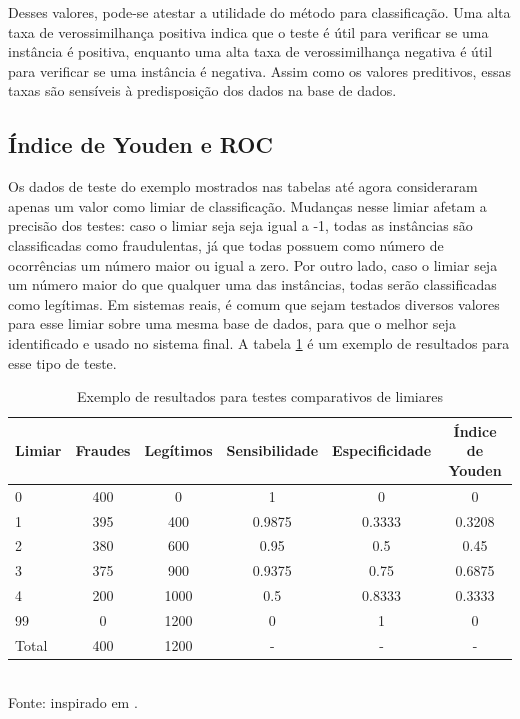 Desses valores, pode-se atestar a utilidade do método para classificação. Uma alta taxa de verossimilhança positiva indica que o teste é útil para verificar se uma instância é positiva, enquanto uma alta taxa de verossimilhança negativa é útil para verificar se uma instância é negativa. Assim como os valores preditivos, essas taxas são sensíveis à predisposição dos dados na base de dados.

\subsection{Índice de Youden e ROC}

Os dados de teste do exemplo mostrados nas tabelas até agora consideraram apenas um valor como limiar de classificação. Mudanças nesse limiar afetam a precisão dos testes: caso o limiar seja seja igual a -1, todas as instâncias são classificadas como fraudulentas, já que todas possuem como número de ocorrências um número maior ou igual a zero. Por outro lado, caso o limiar seja um número maior do que qualquer uma das instâncias, todas serão classificadas como legítimas. Em sistemas reais, é comum que sejam testados diversos valores para esse limiar sobre uma mesma base de dados, para que o melhor seja identificado e usado no sistema final. A tabela \ref{fraud:youden} é um exemplo de resultados para esse tipo de teste.

\begin{table}[h!]
    \caption{Exemplo de resultados para testes comparativos de limiares}
    \label{fraud:youden}
    \centering
    \begin{tabular}{l c c c c c}
        \hline
        Limiar & Fraudes & Legítimos & Sensibilidade & Especificidade & Índice de Youden \\
        \hline
        0     & 400 &    0 & 1      & 0      & 0      \\
        1     & 395 &  400 & 0.9875 & 0.3333 & 0.3208  \\
        2     & 380 &  600 & 0.95   & 0.5    & 0.45   \\
        3     & 375 &  900 & 0.9375 & 0.75   & 0.6875 \\
        4     & 200 & 1000 & 0.5    & 0.8333 & 0.3333 \\
        99    &   0 & 1200 & 0      & 1      & 0      \\
        \hline
        Total & 400 & 1200 &    -   &    -   &    -   \\
        \hline
    \end{tabular}
    \\ Fonte: inspirado em \citet{Bewick2004}.
\end{table}

